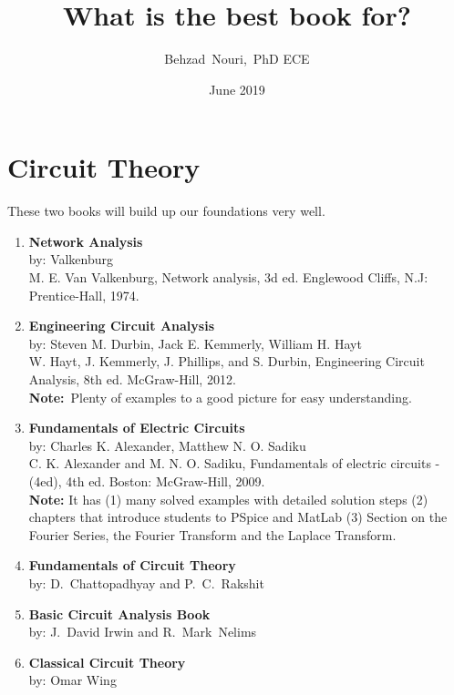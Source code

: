 \documentclass{article}
\title{What is the best book for?}
\author{Behzad~Nouri,~{\small PhD ECE}}
\date{June 2019}
\begin{document}
\maketitle
\tableofcontents
\newpage
\section{Circuit Theory}
These two books will build up our foundations very well.
\begin{enumerate}
\item \textbf{Network Analysis}
    \\by: Valkenburg
    \\[6pt]M. E. Van Valkenburg, Network analysis, 3d ed. Englewood Cliffs, N.J: Prentice-Hall, 1974.
    \item \textbf{Engineering Circuit Analysis}
    \\by: Steven M. Durbin, Jack E. Kemmerly, William H. Hayt
    \\[6pt]W. Hayt, J. Kemmerly, J. Phillips, and S. Durbin, Engineering Circuit Analysis, 8th ed. McGraw-Hill, 2012.
    \\[6pt]\textbf{Note:}~Plenty of examples to a good picture for easy understanding.
    \item \textbf{Fundamentals of Electric Circuits}
    \\by: Charles K. Alexander, Matthew N. O. Sadiku
    \\[6pt]C. K. Alexander and M. N. O. Sadiku, Fundamentals of electric circuits - (4ed), 4th ed. Boston: McGraw-Hill, 2009.
    \\[6pt]\textbf{Note:} It has (1) many solved examples with detailed solution steps (2) chapters that introduce students to PSpice and MatLab (3) Section on the Fourier Series, the Fourier Transform and the Laplace Transform.

    \item \textbf{Fundamentals of Circuit Theory}\\
    by: D.~Chattopadhyay and P.~C.~Rakshit
    \item \textbf{Basic Circuit Analysis Book}\\
    by: J.~David Irwin and R.~Mark~Nelims
    \item\textbf{Classical Circuit Theory}\\
    by: Omar Wing
\end{enumerate}
\end{document}
